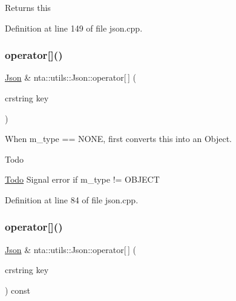Returns this 

Definition at line 149 of file json.\+cpp.

\mbox{\label{classnta_1_1utils_1_1Json_adf2d340a2bf7d59c537e398a1be66cf7}} 
\subsubsection{\texorpdfstring{operator[]()}{operator[]()}\hspace{0.1cm}{\footnotesize\ttfamily [1/4]}}
{\footnotesize\ttfamily \hyperlink{classnta_1_1utils_1_1Json}{Json} \& nta\+::utils\+::\+Json\+::operator\mbox{[}$\,$\mbox{]} (\begin{DoxyParamCaption}\item[{crstring}]{key }\end{DoxyParamCaption})}



When m\+\_\+type == N\+O\+NE, first converts this into an Object. 

\begin{DoxyRefDesc}{Todo}
\item[\hyperlink{todo__todo000017}{Todo}]Signal error if m\+\_\+type != O\+B\+J\+E\+CT \end{DoxyRefDesc}


Definition at line 84 of file json.\+cpp.

\mbox{\label{classnta_1_1utils_1_1Json_ab3b51a07ebed90330c98fd8e20785781}} 
\subsubsection{\texorpdfstring{operator[]()}{operator[]()}\hspace{0.1cm}{\footnotesize\ttfamily [2/4]}}
{\footnotesize\ttfamily \hyperlink{classnta_1_1utils_1_1Json}{Json} \& nta\+::utils\+::\+Json\+::operator\mbox{[}$\,$\mbox{]} (\begin{DoxyParamCaption}\item[{crstring}]{key }\end{DoxyParamCaption}) const}

